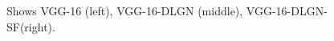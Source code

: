 \begin{figure}
\centering
\begin{minipage}{0.3\columnwidth}
\resizebox{!}{20cm}{

}
\end{minipage}
\begin{minipage}{0.3\columnwidth}
\resizebox{!}{20cm}{

}
\end{minipage}
\begin{minipage}{0.3\columnwidth}
\resizebox{!}{20cm}{

}
\end{minipage}
\caption{Shows VGG-16 (left), VGG-16-DLGN (middle), VGG-16-DLGN-SF(right).}
\label{fig:vggnets}
\end{figure}
